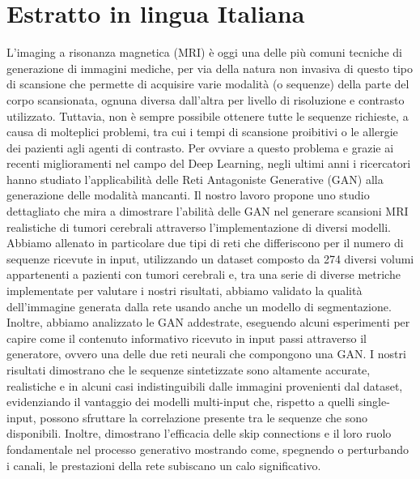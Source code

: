\chapter*{Estratto in lingua Italiana}
\label{cha:estratto}

L'imaging a risonanza magnetica (\ac{MRI}) è oggi una delle più comuni tecniche di generazione di immagini mediche, per via della natura non invasiva di questo tipo di scansione che permette di acquisire varie modalità (o sequenze) della parte del corpo scansionata, ognuna diversa dall'altra per livello di risoluzione e contrasto utilizzato.  Tuttavia, non è sempre possibile ottenere tutte le sequenze richieste, a causa di molteplici problemi, tra cui i tempi di scansione proibitivi o le allergie dei pazienti agli agenti di contrasto. Per ovviare a questo problema e grazie ai recenti miglioramenti nel campo del Deep Learning, negli ultimi anni i ricercatori hanno studiato l'applicabilità delle Reti Antagoniste Generative (\ac{GAN}) alla generazione delle modalità mancanti. Il nostro lavoro propone uno studio dettagliato che mira a dimostrare l'abilità delle GAN nel generare scansioni MRI realistiche di tumori cerebrali attraverso l'implementazione di diversi modelli. Abbiamo allenato in particolare due tipi di reti che differiscono per il numero di sequenze ricevute in input, utilizzando un dataset composto da 274 diversi volumi appartenenti a pazienti con tumori cerebrali e, tra una serie di diverse metriche implementate per valutare i nostri risultati, abbiamo validato la qualità dell'immagine generata dalla rete usando anche un modello di segmentazione.
Inoltre, abbiamo analizzato le \ac{GAN} addestrate, eseguendo alcuni esperimenti per capire come il contenuto informativo ricevuto in input passi attraverso il generatore, ovvero una delle due reti neurali che compongono una GAN. I nostri risultati dimostrano che le sequenze sintetizzate sono altamente accurate, realistiche e in alcuni casi indistinguibili dalle immagini provenienti dal dataset, evidenziando il vantaggio dei modelli multi-input che, rispetto a quelli single-input, possono sfruttare la correlazione presente tra le sequenze che sono disponibili. Inoltre, dimostrano l'efficacia delle skip connections e il loro ruolo fondamentale nel processo generativo mostrando come, spegnendo o perturbando i canali, le prestazioni della rete subiscano un calo significativo.



